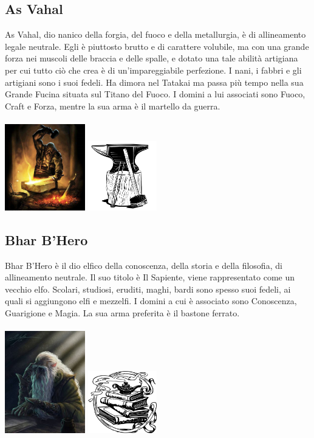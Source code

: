 \documentclass[10pt, a4paper]{report}
\begin{document}
\begin{multicols}{2}
\subsection*{As Vahal}
As Vahal, dio nanico della forgia, del fuoco e della metallurgia, è di allineamento legale neutrale. Egli è piuttosto brutto e di carattere volubile, ma con una grande forza nei muscoli delle braccia e delle spalle, e dotato una tale abilità artigiana per cui tutto ciò che crea è di un'impareggiabile perfezione. I nani, i fabbri e gli artigiani sono i suoi fedeli. Ha dimora nel Tatakai ma passa più tempo nella sua Grande Fucina situata sul Titano del Fuoco. I domini a lui associati sono Fuoco, Craft e Forza, mentre la sua arma è il martello da guerra.\\
\\
\includegraphics[width = 3.5cm]{asvahal.jpg}
\includegraphics[width = 3cm]{asvahal_simbolo.jpg}
\subsection*{Bhar B'Hero}
Bhar B'Hero è il dio elfico della conoscenza, della storia e della filosofia, di allineamento neutrale. Il suo titolo è Il Sapiente, viene rappresentato come un vecchio elfo. Scolari, studiosi, eruditi, maghi, bardi sono spesso suoi fedeli, ai quali si aggiungono elfi e mezzelfi. I domini a cui è associato sono Conoscenza, Guarigione e Magia. La sua arma preferita è il bastone ferrato.\\
\\
\includegraphics[width=3.5cm]{bharbhero.jpg}
\includegraphics[width=3cm]{bharbhero_symbol.png}

\end{multicols}
\end{document}
